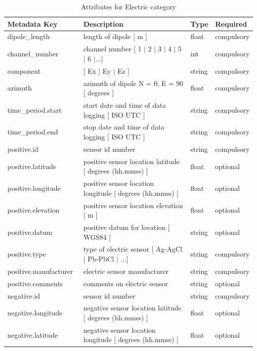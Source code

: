 \documentclass{article}
\begin{document}
\begin{table}[htb!]
    \caption[Attributes for Electric Channel]{Attributes for Electric category}
    \begin{tabular}{|l|p{3in}|l|l|}
        \hline
        \textbf{Metadata Key} & \textbf{Description} & \textbf{Type} & \textbf{Required} \\ \hline
        dipole\_length\ & length of dipole [ m ] & float & compulsory \\ \hline
        channel\_number\ & channel number [ 1 $|$ 2 $|$ 3 $|$ 4 $|$ 5 $|$ 6 $|$...] & int & compulsory \\ \hline
        component\ & [ Ex $|$ Ey $|$ Ez ] & string  & compulsory \\ \hline
        azimuth\ & azimuth of dipole N = 0,  E = 90 [ degrees ] & float & compulsory \\ \hline
        time\_period.start\ & start date and time of data logging [ ISO UTC ] & string & compulsory \\ \hline
        time\_period.end\ & stop date and time of data logging [ ISO UTC ] & string & compulsory \\ \hline
        positive.id\ & sensor id number & string & compulsory \\ \hline
        positive.latitude\ & positive sensor location latitude [ degrees (hh.mmss) ] & float & optional \\ \hline
        positive.longitude\ & positive sensor location longitude [ degrees (hh.mmss) ] & float & optional \\ \hline
        positive.elevation\ & positive sensor location elevation [ m ] & float & optional \\ \hline
        positive.datum\ & positive datum for location [ WGS84 ] & string & optional \\ \hline
        positive.type\ & type of electric sensor [ Ag-AgCl $|$ Pb-PbCl $|$ ...] & string & compulsory \\ \hline
        positive.manufacturer\ & electric sensor manufacturer & string & compulsory \\ \hline
        positive.comments\ & comments on electric sensor & string & optional \\ \hline
        negative.id\ & sensor id number & string & compulsory \\ \hline
        negative.longitude\ & negative sensor location latitude [ degrees (hh.mmss) ] & float & optional \\ \hline
        negative.latitude\ & negative sensor location longitude [ degrees (hh.mmss) ] & float & optional \\ \hline

\end{tabular}
\end{table}
\end{document}
